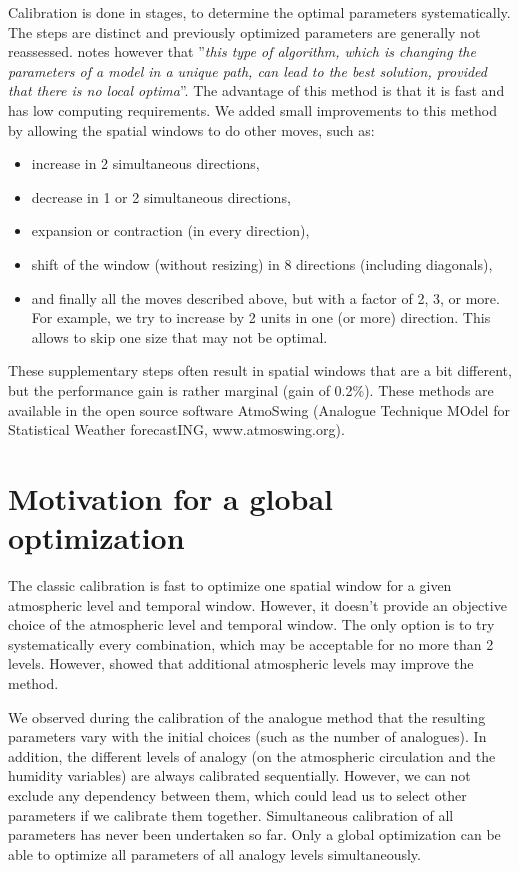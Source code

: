 \documentclass{ametsoc}
\begin{document}
Calibration is done in stages, to determine the optimal parameters systematically. The steps are distinct and previously optimized parameters are generally not reassessed. \citet{Bontron2004} notes however that ''\textit{this type of algorithm, which is changing the parameters of a model in a unique path, can lead to the best solution, provided that there is no local optima}''. The advantage of this method is that it is fast and has low computing requirements. We added small improvements to this method by allowing the spatial windows to do other moves, such as:

\begin{itemize}
	\item increase in 2 simultaneous directions,
	\item decrease in 1 or 2 simultaneous directions,
	\item expansion or contraction (in every direction),
	\item shift of the window (without resizing) in 8 directions (including diagonals),
	\item and finally all the moves described above, but with a factor of 2, 3, or more. For example, we try to increase by 2 units in one (or more) direction. This allows to skip one size that may not be optimal.
\end{itemize}

These supplementary steps often result in spatial windows that are a bit different, but the performance gain is rather marginal (gain of 0.2\%). These methods are available in the open source software AtmoSwing (Analogue Technique MOdel for Statistical Weather forecastING, www.atmoswing.org).


\section{Motivation for a global optimization}

The classic calibration is fast to optimize one spatial window for a given atmospheric level and temporal window. However, it doesn't provide an objective choice of the atmospheric level and temporal window. The only option is to try systematically every combination, which may be acceptable for no more than 2 levels. However, \citet{Horton2012} showed that additional atmospheric levels may improve the method.

We observed during the calibration of the analogue method that the resulting parameters vary with the initial choices (such as the number of analogues). In addition, the different levels of analogy (on the atmospheric circulation and the humidity variables) are always calibrated sequentially. However, we can not exclude any dependency between them, which could lead us to select other parameters if we calibrate them together. Simultaneous calibration of all parameters has never been undertaken so far. Only a global optimization can be able to optimize all parameters of all analogy levels simultaneously.
\end{document}
